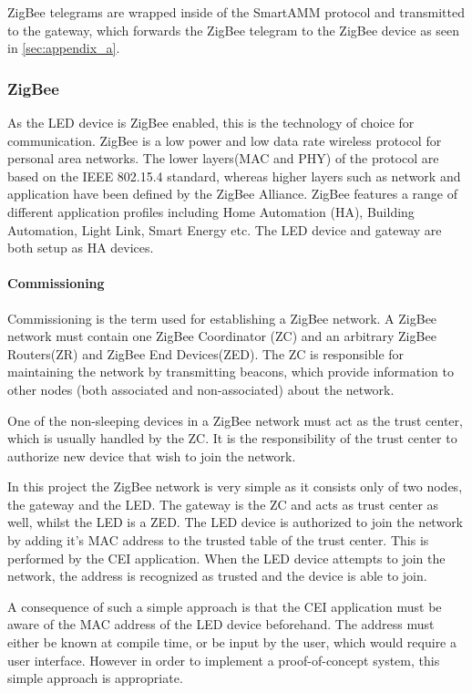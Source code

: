 \documentclass[Main]{subfiles}
\begin{document}
			ZigBee telegrams are wrapped inside of the SmartAMM protocol and transmitted to the gateway, which forwards the ZigBee telegram to the ZigBee device as seen in \ref{sec:appendix_a}.


		\subsubsection{ZigBee}
			As the LED device is ZigBee enabled, this is the technology of choice for communication. 
			ZigBee is a low power and low data rate wireless protocol for personal area networks. 
			The lower layers(MAC and PHY) of the protocol are based on the IEEE 802.15.4 standard\cite{ZigBeeSpec}, whereas higher layers such as network and application have been defined by the ZigBee Alliance.
			ZigBee features a range of different application profiles including Home Automation (HA), Building Automation, Light Link, Smart Energy etc\cite{ZigBeeApplicationProfiles:Online}.
			The LED device and gateway are both setup as HA devices. 

			\paragraph{Commissioning} %
				Commissioning is the term used for establishing a ZigBee network.
				A ZigBee network must contain one ZigBee Coordinator (ZC) and an arbitrary ZigBee Routers(ZR) and ZigBee End Devices(ZED). 
				The ZC is responsible for maintaining the network by transmitting beacons, which provide information to other nodes (both associated and non-associated) about the network.

				One of the non-sleeping devices in a ZigBee network must act as the trust center, which is usually handled by the ZC. 
				It is the responsibility of the trust center to authorize new device that wish to join the network.

				In this project the ZigBee network is very simple as it consists only of two nodes, the gateway and the LED. 
				The gateway is the ZC and acts as trust center as well, whilst the LED is a ZED.
				The LED device is authorized to join the network by adding it's MAC address to the trusted table of the trust center. 
				This is performed by the CEI application.
				When the LED device attempts to join the network, the address is recognized as trusted and the device is able to join. 

				A consequence of such a simple approach is that the CEI application must be aware of the MAC address of the LED device beforehand. 
				The address must either be known at compile time, or be input by the user, which would require a user interface. 
				However in order to implement a proof-of-concept system, this simple approach is appropriate. 			
			\label{par:commissioning}
			
\end{document}
